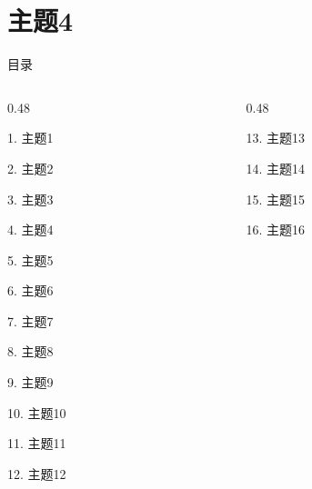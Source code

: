 \documentclass[aspectratio=169,10pt,fontset=fandol]{ctexbeamer}
\begin{document}
\section{主题4}
\begin{frame}[t,fragile]{目录}
\small
\begin{columns}[T,onlytextwidth]
\begin{column}{0.48\textwidth}
{\color{black}\small 1. 主题1\par}\vspace{0.22em}
{\color{black}\small 2. 主题2\par}\vspace{0.22em}
{\color{black}\small 3. 主题3\par}\vspace{0.22em}
{\color{blue}\small 4. 主题4\par}\vspace{0.22em}
{\color{gray!40}\small 5. 主题5\par}\vspace{0.22em}
{\color{gray!40}\small 6. 主题6\par}\vspace{0.22em}
{\color{gray!40}\small 7. 主题7\par}\vspace{0.22em}
{\color{gray!40}\small 8. 主题8\par}\vspace{0.22em}
{\color{gray!40}\small 9. 主题9\par}\vspace{0.22em}
{\color{gray!40}\small 10. 主题10\par}\vspace{0.22em}
{\color{gray!40}\small 11. 主题11\par}\vspace{0.22em}
{\color{gray!40}\small 12. 主题12\par}\vspace{0.22em}
\end{column}
\begin{column}{0.48\textwidth}
{\color{gray!40}\small 13. 主题13\par}\vspace{0.22em}
{\color{gray!40}\small 14. 主题14\par}\vspace{0.22em}
{\color{gray!40}\small 15. 主题15\par}\vspace{0.22em}
{\color{gray!40}\small 16. 主题16\par}\vspace{0.22em}

\end{column}
\end{columns}
\end{frame}
\end{document}
